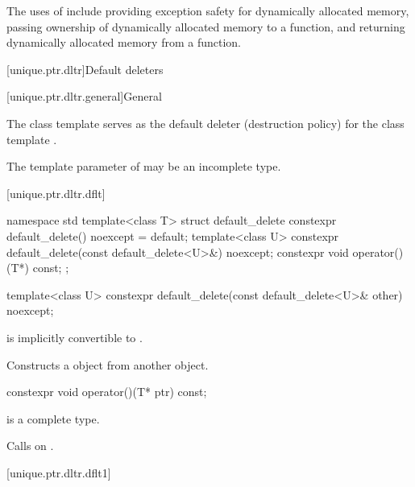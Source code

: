 \pnum
\begin{note}
The uses
of  include providing exception safety for
dynamically allocated memory, passing ownership of dynamically allocated
memory to a function, and returning dynamically allocated memory from a
function.
\end{note}

[unique.ptr.dltr]{Default deleters}

[unique.ptr.dltr.general]{General}

\pnum
The class template  serves as the default deleter (destruction policy)
for the class template .

\pnum
The template parameter  of  may be
an incomplete type.

[unique.ptr.dltr.dflt]{}

\begin{codeblock}
namespace std {
  template<class T> struct default_delete {
    constexpr default_delete() noexcept = default;
    template<class U> constexpr default_delete(const default_delete<U>&) noexcept;
    constexpr void operator()(T*) const;
  };
}
\end{codeblock}

%
\begin{itemdecl}
template<class U> constexpr default_delete(const default_delete<U>& other) noexcept;
\end{itemdecl}

\begin{itemdescr}
\pnum
\constraints
{} is implicitly convertible to .

\pnum
\effects
Constructs a  object
from another  object.
\end{itemdescr}

%
\begin{itemdecl}
constexpr void operator()(T* ptr) const;
\end{itemdecl}

\begin{itemdescr}
\pnum
\mandates
{} is a complete type.

\pnum
\effects
Calls  on .
\end{itemdescr}

[unique.ptr.dltr.dflt1]{}

